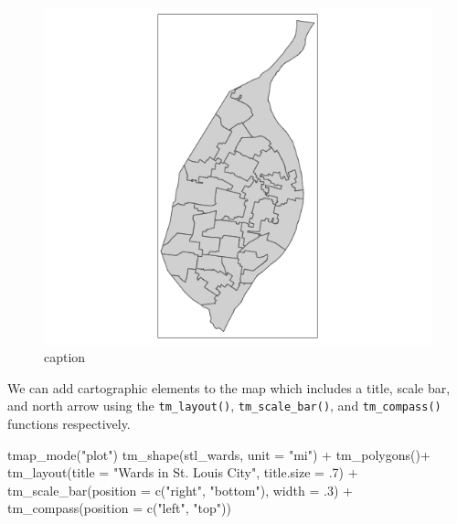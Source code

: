 \documentclass[
  krantz2]{krantz}
\makeatletter
\newenvironment{Shaded}{\begin{snugshade}}{\end{snugshade}}
\newcommand{\AttributeTok}[1]{\textcolor[rgb]{0.61,0.61,0.61}{#1}}
\newcommand{\DecValTok}[1]{\textcolor[rgb]{0.06,0.06,0.06}{#1}}
\newcommand{\FunctionTok}[1]{\textcolor[rgb]{0,0,0}{#1}}
\newcommand{\NormalTok}[1]{#1}
\newcommand{\SpecialCharTok}[1]{\textcolor[rgb]{0,0,0}{#1}}
\newcommand{\StringTok}[1]{\textcolor[rgb]{0.5,0.5,0.5}{#1}}
\newenvironment{kframe}{%
\medskip{}
\setlength{\fboxsep}{.8em}
 \def\at@end@of@kframe{}%
 \ifinner\ifhmode%
  \def\at@end@of@kframe{\end{minipage}}%
  \begin{minipage}{\columnwidth}%
 \fi\fi%
 \def\FrameCommand##1{\hskip\@totalleftmargin \hskip-\fboxsep
 \colorbox{shadecolor}{##1}\hskip-\fboxsep
     \hskip-\linewidth \hskip-\@totalleftmargin \hskip\columnwidth}%
 \MakeFramed {\advance\hsize-\width
   \@totalleftmargin\z@ \linewidth\hsize
   \@setminipage}}%
 {\par\unskip\endMakeFramed%
 \at@end@of@kframe}
\renewenvironment{Shaded}{\begin{kframe}}{\end{kframe}}
\makeatother
\begin{document}
\begin{figure}
\centering
\includegraphics{tmap-images/code-2.png}
\caption{caption}
\end{figure}

We can add cartographic elements to the map which includes a title, scale bar, and north arrow using the \texttt{tm\_layout()}, \texttt{tm\_scale\_bar()}, and \texttt{tm\_compass()} functions respectively.

\begin{Shaded}
\begin{Highlighting}[]
\FunctionTok{tmap\_mode}\NormalTok{(}\StringTok{"plot"}\NormalTok{)}
\FunctionTok{tm\_shape}\NormalTok{(stl\_wards, }\AttributeTok{unit =} \StringTok{"mi"}\NormalTok{) }\SpecialCharTok{+}
  \FunctionTok{tm\_polygons}\NormalTok{()}\SpecialCharTok{+}
  \FunctionTok{tm\_layout}\NormalTok{(}\AttributeTok{title =} \StringTok{"Wards in St. Louis City"}\NormalTok{, }\AttributeTok{title.size =}\NormalTok{ .}\DecValTok{7}\NormalTok{) }\SpecialCharTok{+}
  \FunctionTok{tm\_scale\_bar}\NormalTok{(}\AttributeTok{position =} \FunctionTok{c}\NormalTok{(}\StringTok{"right"}\NormalTok{, }\StringTok{"bottom"}\NormalTok{), }\AttributeTok{width =}\NormalTok{ .}\DecValTok{3}\NormalTok{) }\SpecialCharTok{+}
  \FunctionTok{tm\_compass}\NormalTok{(}\AttributeTok{position =} \FunctionTok{c}\NormalTok{(}\StringTok{"left"}\NormalTok{, }\StringTok{"top"}\NormalTok{))}
\end{Highlighting}
\end{Shaded}
\end{document}
